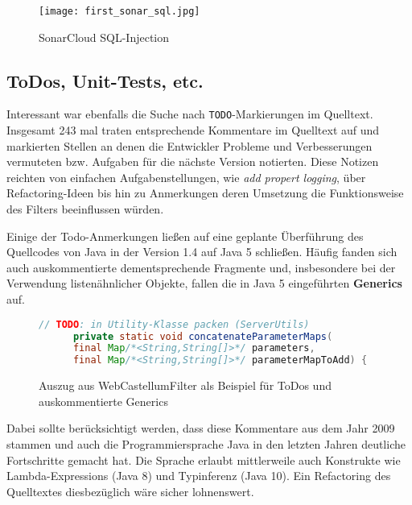 \begin{figure}
    \centering
    \texttt{[image: first\_sonar\_sql.jpg]}
    \caption{SonarCloud SQL-Injection}
    \label{fig:my_sonar2}
\end{figure}



\subsection{ToDos, Unit-Tests,  etc.}

Interessant war ebenfalls die Suche nach \verb=TODO=-Markierungen im Quelltext. Insgesamt 243 mal traten entsprechende Kommentare im Quelltext auf und markierten Stellen an denen die Entwickler Probleme und Verbesserungen vermuteten bzw. Aufgaben für die nächste Version notierten. Diese Notizen reichten von einfachen Aufgabenstellungen, wie \glqq\emph{add propert logging}\grqq, über Refactoring-Ideen bis hin zu Anmerkungen deren Umsetzung die Funktionsweise des Filters beeinflussen würden. 

Einige der Todo-Anmerkungen ließen auf eine geplante Überführung des Quellcodes von Java in der Version 1.4 auf Java 5 schließen. Häufig fanden sich auch auskommentierte dementsprechende Fragmente und, insbesondere bei der Verwendung listenähnlicher Objekte, fallen die in Java 5 eingeführten \textbf{Generics} auf.

\begin{figure}[h]
  \begin{small}
    \begin{lstlisting}[language=java]
      // TODO: in Utility-Klasse packen (ServerUtils)
      private static void concatenateParameterMaps(
      final Map/*<String,String[]>*/ parameters, 
      final Map/*<String,String[]>*/ parameterMapToAdd) {
    \end{lstlisting}
  \end{small}
  \caption{Auszug aus WebCastellumFilter als Beispiel für ToDos und auskommentierte Generics}
  \label{fig:my_l2}
\end{figure}
  
Dabei sollte berücksichtigt werden, dass diese Kommentare aus dem Jahr 2009 stammen und auch die Programmiersprache Java in den letzten Jahren deutliche Fortschritte gemacht hat. Die Sprache erlaubt mittlerweile auch Konstrukte wie Lambda-Expressions (Java 8) und Typinferenz (Java 10). Ein Refactoring des Quelltextes diesbezüglich wäre sicher lohnenswert.




